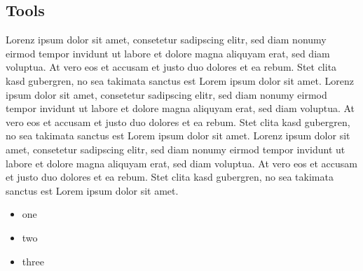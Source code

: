 \subsection{Tools}\label{subsec:Tools}
Lorenz ipsum dolor sit amet, consetetur sadipscing elitr, sed diam nonumy eirmod tempor invidunt ut labore et dolore magna aliquyam erat, sed diam voluptua.
At vero eos et accusam et justo duo dolores et ea rebum.
Stet clita kasd gubergren, no sea takimata sanctus est Lorem ipsum dolor sit amet.
Lorenz ipsum dolor sit amet, consetetur sadipscing elitr, sed diam nonumy eirmod tempor invidunt ut labore et dolore magna aliquyam erat, sed diam voluptua.
At vero eos et accusam et justo duo dolores et ea rebum.
Stet clita kasd gubergren, no sea takimata sanctus est Lorem ipsum dolor sit amet.
Lorenz ipsum dolor sit amet, consetetur sadipscing elitr, sed diam nonumy eirmod tempor invidunt ut labore et dolore magna aliquyam erat, sed diam voluptua.
At vero eos et accusam et justo duo dolores et ea rebum.
Stet clita kasd gubergren, no sea takimata sanctus est Lorem ipsum dolor sit amet.

\begin{itemize}
\item one
\item two
\item three
\end{itemize}

